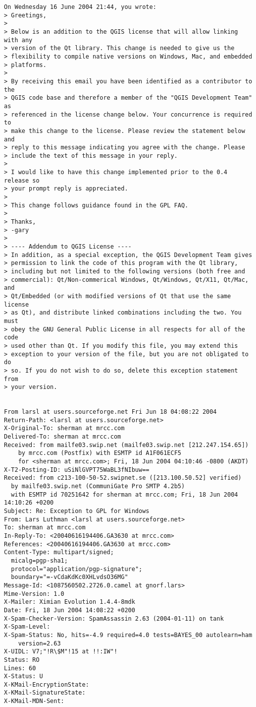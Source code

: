 \begin{small}
\begin{verbatim}
On Wednesday 16 June 2004 21:44, you wrote:
> Greetings,
>
> Below is an addition to the QGIS license that will allow linking with any
> version of the Qt library. This change is needed to give us the
> flexibility to compile native versions on Windows, Mac, and embedded
> platforms.
>
> By receiving this email you have been identified as a contributor to the
> QGIS code base and therefore a member of the "QGIS Development Team" as
> referenced in the license change below. Your concurrence is required to
> make this change to the license. Please review the statement below and
> reply to this message indicating you agree with the change. Please
> include the text of this message in your reply.
>
> I would like to have this change implemented prior to the 0.4 release so
> your prompt reply is appreciated.
>
> This change follows guidance found in the GPL FAQ.
>
> Thanks,
> -gary
>
> ---- Addendum to QGIS License ----
> In addition, as a special exception, the QGIS Development Team gives
> permission to link the code of this program with the Qt library,
> including but not limited to the following versions (both free and
> commercial): Qt/Non-commerical Windows, Qt/Windows, Qt/X11, Qt/Mac, and
> Qt/Embedded (or with modified versions of Qt that use the same license
> as Qt), and distribute linked combinations including the two. You must
> obey the GNU General Public License in all respects for all of the code
> used other than Qt. If you modify this file, you may extend this
> exception to your version of the file, but you are not obligated to do
> so. If you do not wish to do so, delete this exception statement from
> your version.


From larsl at users.sourceforge.net Fri Jun 18 04:08:22 2004
Return-Path: <larsl at users.sourceforge.net>
X-Original-To: sherman at mrcc.com
Delivered-To: sherman at mrcc.com
Received: from mailfe03.swip.net (mailfe03.swip.net [212.247.154.65])
	by mrcc.com (Postfix) with ESMTP id A1F061ECF5
	for <sherman at mrcc.com>; Fri, 18 Jun 2004 04:10:46 -0800 (AKDT)
X-T2-Posting-ID: uSiNlGVPT75WaBL3fNIbuw==
Received: from c213-100-50-52.swipnet.se ([213.100.50.52] verified)
  by mailfe03.swip.net (CommuniGate Pro SMTP 4.2b5)
  with ESMTP id 70251642 for sherman at mrcc.com; Fri, 18 Jun 2004 14:10:26 +0200
Subject: Re: Exception to GPL for Windows
From: Lars Luthman <larsl at users.sourceforge.net>
To: sherman at mrcc.com
In-Reply-To: <20040616194406.GA3630 at mrcc.com>
References: <20040616194406.GA3630 at mrcc.com>
Content-Type: multipart/signed;
  micalg=pgp-sha1;
  protocol="application/pgp-signature";
  boundary="=-vCdaKdKc0XHLvdsO36MG"
Message-Id: <1087560502.2726.0.camel at gnorf.lars>
Mime-Version: 1.0
X-Mailer: Ximian Evolution 1.4.4-8mdk 
Date: Fri, 18 Jun 2004 14:08:22 +0200
X-Spam-Checker-Version: SpamAssassin 2.63 (2004-01-11) on tank
X-Spam-Level: 
X-Spam-Status: No, hits=-4.9 required=4.0 tests=BAYES_00 autolearn=ham 
	version=2.63
X-UIDL: V7;"!R\$M"!15 at !!:IW"!
Status: RO
Lines: 60
X-Status: U
X-KMail-EncryptionState:  
X-KMail-SignatureState:  
X-KMail-MDN-Sent:  



\end{verbatim}
\end{small}

